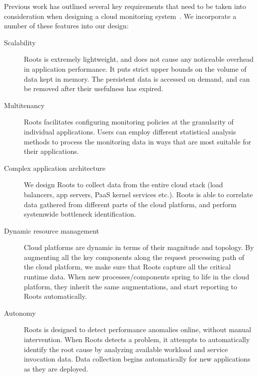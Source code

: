 Previous work has outlined several key requirements that need to be taken into consideration when
designing a cloud monitoring system~\cite{DaCunhaRodrigues:2016:MCC:2851613.2851619,Ibidunmoye:2015:PAD:2808687.2791120}. 
We incorporate a number of these features into our design:
\begin{description}
\item[Scalability] Roots is extremely lightweight, and does not cause any noticeable overhead in 
application performance. It puts strict upper bounds on the volume of data kept in memory. 
The persistent data is accessed on demand, and can be removed after their usefulness has expired.
\item[Multitenancy] Roots facilitates configuring monitoring policies at the granularity of individual applications.
Users can employ different statistical analysis methods to process the monitoring data in ways that are 
most suitable for their applications.
\item[Complex application architecture] We design Roots to collect data from the entire cloud stack 
(load balancers, app servers, PaaS kernel services etc.). Roots is able to correlate data gathered
from different parts of the cloud platform, and perform systemwide bottleneck identification.
\item[Dynamic resource management] Cloud platforms are dynamic in terms of their magnitude 
and topology. By augmenting all the key components along the request processing path of the cloud platform,
we make sure that Roots capture all the critical runtime data. When new processes/components
spring to life in the cloud platform, they inherit the same augmentations, and start reporting to Roots automatically.
\item[Autonomy] Roots is designed to detect performance anomalies online, without manual intervention.
When Roots detects a problem, it attempts to automatically identify the root cause by analyzing
available workload and service invocation data. Data collection begins automatically for new
applications as they are deployed.
\end{description}


